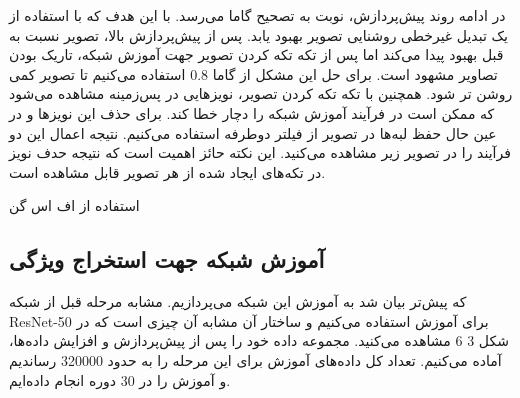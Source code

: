 در ادامه روند پیش‌پردازش، نوبت به تصحیح گاما می‌رسد. با این هدف که با استفاده از یک تبدیل غیرخطی روشنایی تصویر بهبود یابد. پس از پیش‌پردازش بالا، تصویر نسبت به قبل بهبود پیدا می‌کند اما پس از تکه تکه کردن تصویر جهت آموزش شبکه، تاریک بودن تصاویر مشهود است. برای حل این مشکل از گاما 0.8 استفاده می‌کنیم تا تصویر کمی روشن تر شود.
همچنین با تکه تکه کردن تصویر، نویزهایی در پس‌زمینه مشاهده می‌شود که ممکن است در فرآیند آموزش شبکه را دچار خطا کند. برای حذف این نویزها و در عین حال حفظ لبه‌ها در تصویر از فیلتر دوطرفه  استفاده می‌کنیم.
نتیجه اعمال این دو فرآیند را در تصویر زیر مشاهده می‌کنید. این نکته حائز اهمیت است که نتیجه حدف نویز در تکه‌های ایجاد شده از هر تصویر قابل مشاهده است.

استفاده از اف اس گن
\subsection{آموزش شبکه جهت استخراج ویژگی}
که پیش‌تر بیان شد به آموزش این شبکه می‌پردازیم. مشابه مرحله قبل از شبکه ResNet-50 برای آموزش استفاده می‌کنیم و ساختار آن مشابه آن چیزی است که در شکل ‏3 6 مشاهده می‌کنید. مجموعه داده خود را پس از پیش‌پردازش و افزایش‌ داده‌ها، آماده می‌کنیم. تعداد کل داده‌های آموزش برای این مرحله را به حدود 320000 رساندیم و آموزش را در 30 دوره انجام داده‌ایم.
